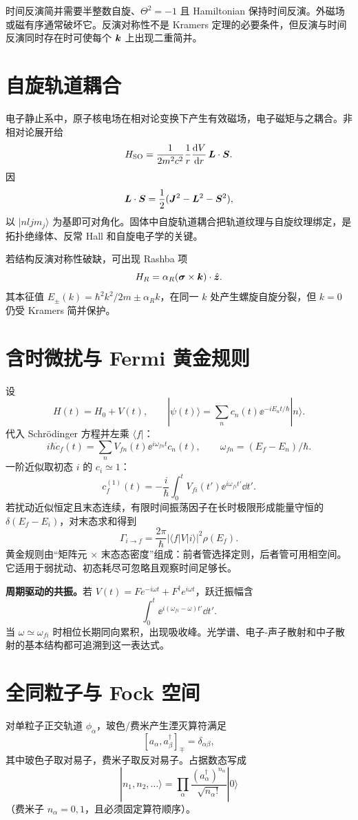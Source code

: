 \begin{pitfallbox}
时间反演简并需要半整数自旋、$\Theta^2=-1$ 且 Hamiltonian 保持时间反演。外磁场或磁有序通常破坏它。反演对称性不是 Kramers 定理的必要条件，但反演与时间反演同时存在时可使每个 $\bm{k}$ 上出现二重简并。
\end{pitfallbox}

\section{自旋轨道耦合}
电子静止系中，原子核电场在相对论变换下产生有效磁场，电子磁矩与之耦合。非相对论展开给
\[
H_{\rm SO}=\frac{1}{2m^2c^2}\frac1r\frac{\mathrm d V}{\mathrm d r}\,\bm{L}\cdot\bm{S}.
\]
因
\[
\bm{L}\cdot\bm{S}=\frac12(\bm{J}^2-\bm{L}^2-\bm{S}^2),
\]
以 $|nljm_j\rangle$ 为基即可对角化。固体中自旋轨道耦合把轨道纹理与自旋纹理绑定，是拓扑绝缘体、反常 Hall 和自旋电子学的关键。

若结构反演对称性破缺，可出现 Rashba 项
\[
H_R=\alpha_R(\bm{\sigma}\times\bm{k})\cdot\hat{\bm{z}}.
\]
其本征值 $E_\pm(k)=\hbar^2k^2/2m\pm\alpha_Rk$，在同一 $k$ 处产生螺旋自旋分裂，但 $k=0$ 仍受 Kramers 简并保护。

\section{含时微扰与 Fermi 黄金规则}
设
\[
H(t)=H_0+V(t),\qquad
|\psi(t)\rangle=\sum_n c_n(t)\ee^{-iE_nt/\hbar}|n\rangle.
\]
代入 Schrödinger 方程并左乘 $\langle f|$：
\[
i\hbar\dot c_f(t)=\sum_n V_{fn}(t)
\ee^{i\omega_{fn}t}c_n(t),\qquad
\omega_{fn}=(E_f-E_n)/\hbar.
\]
一阶近似取初态 $i$ 的 $c_i\simeq1$：
\[
c_f^{(1)}(t)=-\frac{i}{\hbar}\int_0^t
V_{fi}(t')\ee^{i\omega_{fi}t'}\dd t'.
\]
若扰动近似恒定且末态连续，有限时间振荡因子在长时极限形成能量守恒的
$\delta(E_f-E_i)$，对末态求和得到
\[
\boxed{\Gamma_{i\to f}=\frac{2\pi}{\hbar}
|\langle f|V|i\rangle|^2\rho(E_f)}.
\]
黄金规则由“矩阵元 $\times$ 末态态密度”组成：前者管选择定则，后者管可用相空间。它适用于弱扰动、初态耗尽可忽略且观察时间足够长。

\begin{examplebox}
\textbf{周期驱动的共振。}若
$V(t)=Fe^{-i\omega t}+F^\dagger e^{i\omega t}$，跃迁振幅含
\[
\int_0^t\ee^{i(\omega_{fi}-\omega)t'}\dd t'.
\]
当 $\omega\simeq\omega_{fi}$ 时相位长期同向累积，出现吸收峰。光学谱、电子-声子散射和中子散射的基本结构都可追溯到这一表达式。
\end{examplebox}

\section{全同粒子与 Fock 空间}
对单粒子正交轨道 $\phi_\alpha$，玻色/费米产生湮灭算符满足
\[
[a_\alpha,a_\beta^\dagger]_{\mp}=\delta_{\alpha\beta},
\]
其中玻色子取对易子，费米子取反对易子。占据数态写成
\[
|n_1,n_2,\ldots\rangle
=\prod_\alpha\frac{(a_\alpha^\dagger)^{n_\alpha}}
{\sqrt{n_\alpha!}}|0\rangle
\]
（费米子 $n_\alpha=0,1$，且必须固定算符顺序）。

